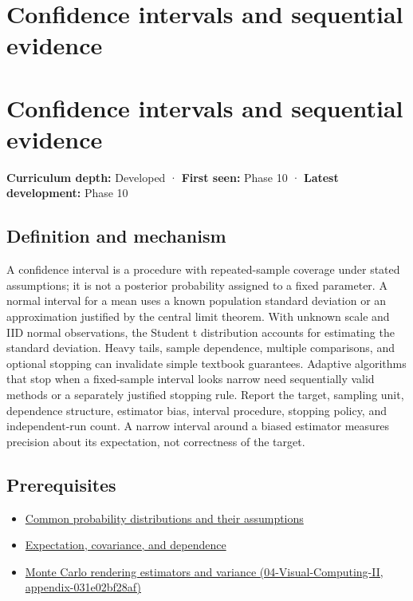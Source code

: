 \hypertarget{appendix-c83016554b1e}{}
\section*{Confidence intervals and sequential evidence}
\section{Confidence intervals and sequential evidence}\label{appendix-c83016554b1e-confidence-intervals-and-sequential-evidence}

\textbf{Curriculum depth:} Developed · \textbf{First seen:} Phase 10 · \textbf{Latest development:} Phase 10

\subsection{Definition and mechanism}\label{appendix-c83016554b1e-definition-and-mechanism}

A confidence interval is a procedure with repeated-sample coverage under stated assumptions; it is not a posterior probability assigned to a fixed parameter. A normal interval for a mean uses a known population standard deviation or an approximation justified by the central limit theorem. With unknown scale and IID normal observations, the Student t distribution accounts for estimating the standard deviation. Heavy tails, sample dependence, multiple comparisons, and optional stopping can invalidate simple textbook guarantees. Adaptive algorithms that stop when a fixed-sample interval looks narrow need sequentially valid methods or a separately justified stopping rule. Report the target, sampling unit, dependence structure, estimator bias, interval procedure, stopping policy, and independent-run count. A narrow interval around a biased estimator measures precision about its expectation, not correctness of the target.

\subsection{Prerequisites}\label{appendix-c83016554b1e-prerequisites}

\begin{itemize}
\tightlist
\item
  \hyperref[appendix-a2360b435383]{Common probability distributions and their assumptions}
\item
  \hyperref[appendix-54c383df9992]{Expectation, covariance, and dependence}
\item
  \href{../04-Visual-Computing-II/main.pdf\#nameddest=appendix-031e02bf28af}{Monte Carlo rendering estimators and variance (04-Visual-Computing-II, appendix-031e02bf28af)}
\end{itemize}

